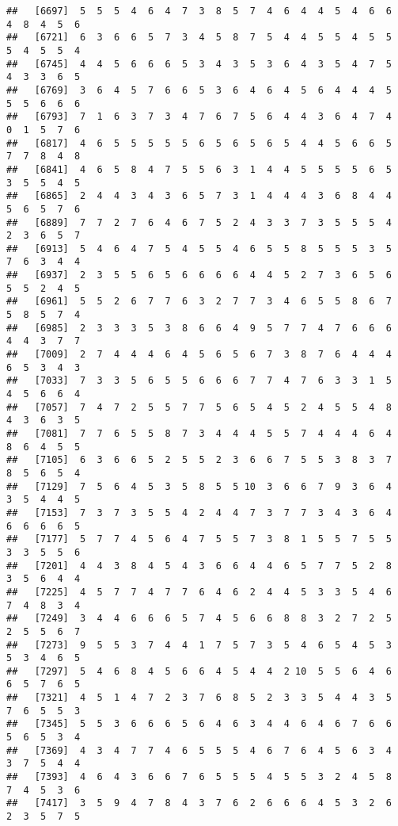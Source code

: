 \documentclass[
]{book}
\begin{document}
\begin{verbatim}
##   [6697]  5  5  5  4  6  4  7  3  8  5  7  4  6  4  4  5  4  6  6  4  8  4  5  6
##   [6721]  6  3  6  6  5  7  3  4  5  8  7  5  4  4  5  5  4  5  5  5  4  5  5  4
##   [6745]  4  4  5  6  6  6  5  3  4  3  5  3  6  4  3  5  4  7  5  4  3  3  6  5
##   [6769]  3  6  4  5  7  6  6  5  3  6  4  6  4  5  6  4  4  4  5  5  5  6  6  6
##   [6793]  7  1  6  3  7  3  4  7  6  7  5  6  4  4  3  6  4  7  4  0  1  5  7  6
##   [6817]  4  6  5  5  5  5  5  6  5  6  5  6  5  4  4  5  6  6  5  7  7  8  4  8
##   [6841]  4  6  5  8  4  7  5  5  6  3  1  4  4  5  5  5  5  6  5  3  5  5  4  5
##   [6865]  2  4  4  3  4  3  6  5  7  3  1  4  4  4  3  6  8  4  4  5  6  5  7  6
##   [6889]  7  7  2  7  6  4  6  7  5  2  4  3  3  7  3  5  5  5  4  2  3  6  5  7
##   [6913]  5  4  6  4  7  5  4  5  5  4  6  5  5  8  5  5  5  3  5  7  6  3  4  4
##   [6937]  2  3  5  5  6  5  6  6  6  6  4  4  5  2  7  3  6  5  6  5  5  2  4  5
##   [6961]  5  5  2  6  7  7  6  3  2  7  7  3  4  6  5  5  8  6  7  5  8  5  7  4
##   [6985]  2  3  3  3  5  3  8  6  6  4  9  5  7  7  4  7  6  6  6  4  4  3  7  7
##   [7009]  2  7  4  4  4  6  4  5  6  5  6  7  3  8  7  6  4  4  4  6  5  3  4  3
##   [7033]  7  3  3  5  6  5  5  6  6  6  7  7  4  7  6  3  3  1  5  4  5  6  6  4
##   [7057]  7  4  7  2  5  5  7  7  5  6  5  4  5  2  4  5  5  4  8  4  3  6  3  5
##   [7081]  7  7  6  5  5  8  7  3  4  4  4  5  5  7  4  4  4  6  4  8  6  4  5  5
##   [7105]  6  3  6  6  5  2  5  5  2  3  6  6  7  5  5  3  8  3  7  8  5  6  5  4
##   [7129]  7  5  6  4  5  3  5  8  5  5 10  3  6  6  7  9  3  6  4  3  5  4  4  5
##   [7153]  7  3  7  3  5  5  4  2  4  4  7  3  7  7  3  4  3  6  4  6  6  6  6  5
##   [7177]  5  7  7  4  5  6  4  7  5  5  7  3  8  1  5  5  7  5  5  3  3  5  5  6
##   [7201]  4  4  3  8  4  5  4  3  6  6  4  4  6  5  7  7  5  2  8  3  5  6  4  4
##   [7225]  4  5  7  7  4  7  7  6  4  6  2  4  4  5  3  3  5  4  6  7  4  8  3  4
##   [7249]  3  4  4  6  6  6  5  7  4  5  6  6  8  8  3  2  7  2  5  2  5  5  6  7
##   [7273]  9  5  5  3  7  4  4  1  7  5  7  3  5  4  6  5  4  5  3  5  3  4  6  5
##   [7297]  5  4  6  8  4  5  6  6  4  5  4  4  2 10  5  5  6  4  6  6  5  7  6  5
##   [7321]  4  5  1  4  7  2  3  7  6  8  5  2  3  3  5  4  4  3  5  7  6  5  5  3
##   [7345]  5  5  3  6  6  6  5  6  4  6  3  4  4  6  4  6  7  6  6  5  6  5  3  4
##   [7369]  4  3  4  7  7  4  6  5  5  5  4  6  7  6  4  5  6  3  4  3  7  5  4  4
##   [7393]  4  6  4  3  6  6  7  6  5  5  5  4  5  5  3  2  4  5  8  7  4  5  3  6
##   [7417]  3  5  9  4  7  8  4  3  7  6  2  6  6  6  4  5  3  2  6  2  3  5  7  5

\end{verbatim}
\end{document}

